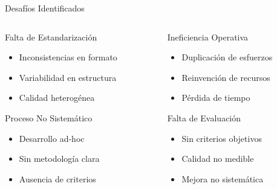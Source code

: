 \documentclass[10pt,aspectratio=169]{beamer}
\begin{document}
\begin{frame}{Desafíos Identificados}
	\begin{columns}
		\begin{column}{0.5\textwidth}
			\begin{block}{Falta de Estandarización}
				\begin{itemize}
					\item Inconsistencias en formato
					\item Variabilidad en estructura
					\item Calidad heterogénea
				\end{itemize}
			\end{block}
			\begin{block}{Proceso No Sistemático}
					\begin{itemize}
						\item Desarrollo ad-hoc
						\item Sin metodología clara
						\item Ausencia de criterios
					\end{itemize}
				\end{block}
			\end{column}
			
			\begin{column}{0.5\textwidth}
				\begin{block}{Ineficiencia Operativa}
					\begin{itemize}
						\item Duplicación de esfuerzos
						\item Reinvención de recursos
						\item Pérdida de tiempo
					\end{itemize}
				\end{block}
				
				\begin{block}{Falta de Evaluación}
					\begin{itemize}
						\item Sin criterios objetivos
						\item Calidad no medible
						\item Mejora no sistemática
					\end{itemize}
				\end{block}
			\end{column}
		\end{columns}
	\end{frame}
	
	
\end{document}
